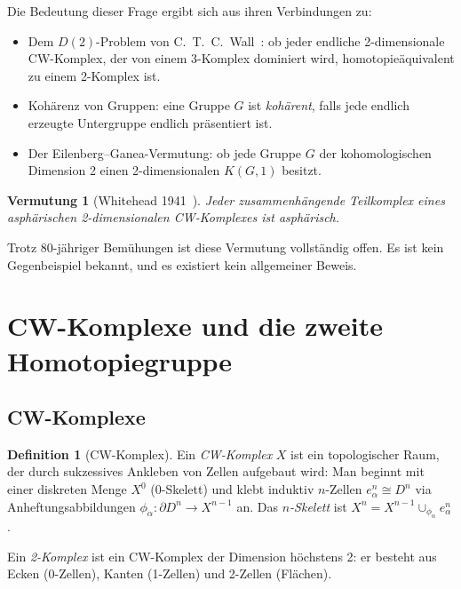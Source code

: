 \documentclass[12pt,a4paper]{amsart}
\newtheorem{vermutung}[theorem]{Vermutung}
\theoremstyle{definition}
\newtheorem{definition_de}[theorem]{Definition}
\theoremstyle{remark}
\begin{document}
Die Bedeutung dieser Frage ergibt sich aus ihren Verbindungen zu:
\begin{itemize}
\item Dem $D(2)$-Problem von C.~T.~C.~Wall~\cite{Wall1965}: ob jeder endliche
      2-dimensionale CW-Komplex, der von einem 3-Komplex dominiert wird,
      homotopieäquivalent zu einem 2-Komplex ist.
\item Kohärenz von Gruppen: eine Gruppe $G$ ist \emph{kohärent}, falls jede
      endlich erzeugte Untergruppe endlich präsentiert ist.
\item Der Eilenberg--Ganea-Vermutung: ob jede Gruppe $G$ der kohomologischen
      Dimension 2 einen 2-dimensionalen $K(G,1)$ besitzt.
\end{itemize}

\begin{vermutung}[Whitehead 1941~\cite{Whitehead1941}]
\label{verm:Whitehead}
Jeder zusammenhängende Teilkomplex eines asphärischen 2-dimensionalen
CW-Komplexes ist asphärisch.
\end{vermutung}

Trotz 80-jähriger Bemühungen ist diese Vermutung vollständig offen.
Es ist kein Gegenbeispiel bekannt, und es existiert kein allgemeiner Beweis.

\section{CW-Komplexe und die zweite Homotopiegruppe}

\subsection{CW-Komplexe}

\begin{definition_de}[CW-Komplex]
Ein \emph{CW-Komplex} $X$ ist ein topologischer Raum, der durch sukzessives
Ankleben von Zellen aufgebaut wird: Man beginnt mit einer diskreten Menge
$X^0$ (0-Skelett) und klebt induktiv $n$-Zellen $e_\alpha^n \cong D^n$
via Anheftungsabbildungen $\phi_\alpha \colon \partial D^n \to X^{n-1}$ an.
Das \emph{$n$-Skelett} ist $X^n = X^{n-1} \cup_{\phi_\alpha} e_\alpha^n$.
\end{definition_de}

Ein \emph{2-Komplex} ist ein CW-Komplex der Dimension höchstens 2:
er besteht aus Ecken (0-Zellen), Kanten (1-Zellen) und 2-Zellen (Flächen).
\end{document}
